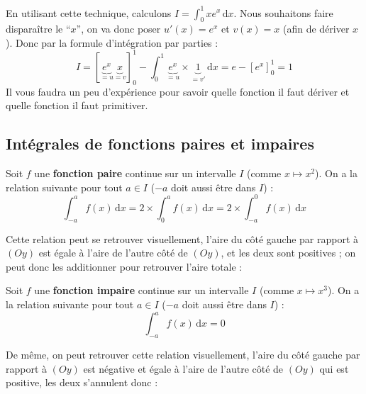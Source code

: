 	\begin{tip}[Exemple]
		En utilisant cette technique, calculons $I = \int_{0}^1 xe^x \, \mathrm{d}x$. Nous souhaitons faire disparaître le ``$x$'', on va donc poser $u'(x) = e^x$ et $v(x) = x$ (afin de dériver $x$).
		\newpar
		Donc par la formule d'intégration par parties :
		\[ I = \left[\underbrace{e^x}_{= u} \underbrace{x}_{= v}\right]_0^1 - \int_{0}^1 \underbrace{e^x}_{= u} \times \underbrace{1}_{= v'} \, \mathrm{d}x = e - \left[ e^x \right]_0^1 = 1 \]
		Il vous faudra un peu d'expérience pour savoir quelle fonction il faut dériver et quelle fonction il faut primitiver.
	\end{tip}
	
	\subsection{Intégrales de fonctions paires et impaires}
	\label{integrales-paires-impaires}
	
	\begin{formula}
		Soit $f$ une \textbf{fonction paire} continue sur un intervalle $I$ (comme $x \mapsto x^2$). On a la relation suivante pour tout $a \in I$ ($-a$ doit aussi être dans $I$) :
		\[ \int_{-a}^{a} f(x) \, \mathrm{d}x = 2 \times \int_{0}^{a} f(x) \, \mathrm{d}x = 2 \times \int_{-a}^{0} f(x) \, \mathrm{d}x \]
	\end{formula}
	
	\begin{tip}[Exemple]
		Cette relation peut se retrouver visuellement, l'aire du côté gauche par rapport à $(Oy)$ est égale à l'aire de l'autre côté de $(Oy)$, et les deux sont positives ; on peut donc les additionner pour retrouver l'aire totale :
	\end{tip}
	
	\begin{formula}
		Soit $f$ une \textbf{fonction impaire} continue sur un intervalle $I$ (comme $x \mapsto x^3$). On a la relation suivante pour tout $a \in I$ ($-a$ doit aussi être dans $I$) :
		\[ \int_{-a}^{a} f(x) \, \mathrm{d}x = 0 \]
	\end{formula}
	
	\begin{tip}[Exemple]
		De même, on peut retrouver cette relation visuellement, l'aire du côté gauche par rapport à $(Oy)$ est négative et égale à l'aire de l'autre côté de $(Oy)$ qui est positive, les deux s'annulent donc :
	\end{tip}
	
